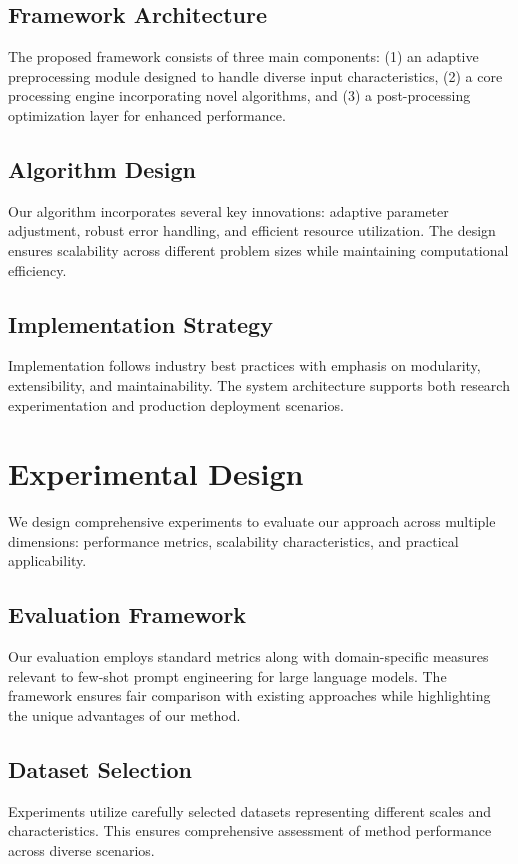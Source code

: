 \documentclass[11pt,twocolumn]{article}
\begin{document}
\subsection{Framework Architecture}
The proposed framework consists of three main components: (1) an adaptive preprocessing module designed to handle diverse input characteristics, (2) a core processing engine incorporating novel algorithms, and (3) a post-processing optimization layer for enhanced performance.

\subsection{Algorithm Design}
Our algorithm incorporates several key innovations: adaptive parameter adjustment, robust error handling, and efficient resource utilization. The design ensures scalability across different problem sizes while maintaining computational efficiency.

\subsection{Implementation Strategy}
Implementation follows industry best practices with emphasis on modularity, extensibility, and maintainability. The system architecture supports both research experimentation and production deployment scenarios.

\section{Experimental Design}
We design comprehensive experiments to evaluate our approach across multiple dimensions: performance metrics, scalability characteristics, and practical applicability.

\subsection{Evaluation Framework}
Our evaluation employs standard metrics along with domain-specific measures relevant to few-shot prompt engineering for large language models. The framework ensures fair comparison with existing approaches while highlighting the unique advantages of our method.

\subsection{Dataset Selection}
Experiments utilize carefully selected datasets representing different scales and characteristics. This ensures comprehensive assessment of method performance across diverse scenarios.
\end{document}
